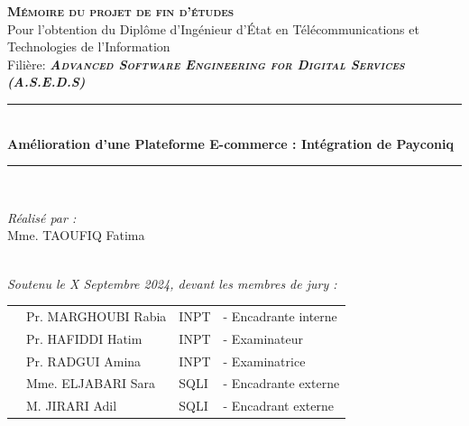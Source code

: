 \vspace{0.4cm}
\begin{center}
{\large \textsc{\textbf{Mémoire du projet de fin d'études}}}\\[0.1cm]
{\large {Pour l’obtention du Diplôme d’Ingénieur d’État en Télécommunications 
et Technologies de l’Information}}\\[0.1cm]
{\large Filière:\textsc{\textit{\textbf{ Advanced Software Engineering for Digital Services (A.S.E.D.S)}}}} \\[0.05cm] 
\vspace{0.4cm}
\vspace{-0.04cm}
\rule{\linewidth}{0.3mm} \\[0.3cm]   %
 { \huge \textbf{Amélioration d'une Plateforme E-commerce : Intégration de Payconiq}} \\[0.15cm] 
\rule{\linewidth}{0.3mm} \\[0.3cm]



\vspace{0.8cm}

\noindent
\begin{minipage}{0.9\textwidth}
    \vspace{-7mm}
  \begin{flushleft} \large
    \emph{Réalisé par :}\\
    Mme. TAOUFIQ Fatima %
  \end{flushleft}
\end{minipage}
\begin{minipage}{0.4\textwidth}

\end{minipage}\\[0.3cm]

{\large \textit{Soutenu le X Septembre 2024, devant les membres de jury : }}\\[0.3cm]


\begin{tabular}{p{1cm}lll}
  & \large Pr. MARGHOUBI Rabia & \large INPT & \large - Encadrante interne  \\[0.1cm]
  & \large Pr. HAFIDDI Hatim & \large INPT & \large - Examinateur \\[0.1cm]
  & \large Pr. RADGUI Amina & \large INPT & \large - Examinatrice  \\[0.1cm]
  & \large Mme. ELJABARI Sara & \large SQLI & \large - Encadrante externe  \\[0.1cm]
  & \large M. JIRARI Adil & \large SQLI & \large - Encadrant externe  \\[0.1cm]



\end{tabular}
\end{center}
